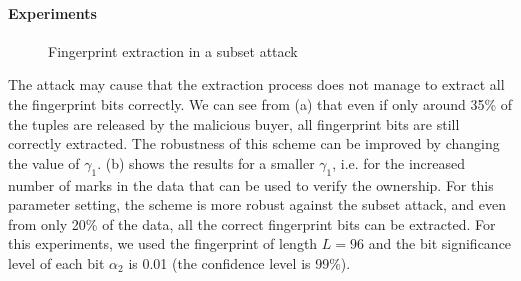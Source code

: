 \paragraph{Experiments}

\begin{figure}
\centering
    \qquad
    \caption{Fingerprint extraction in a subset attack}
    \label{fig:subset-attack-two-level-fp-bits}
\end{figure}

The attack may cause that the extraction process does not manage to extract all the fingerprint bits correctly.
We can see from (a) that even if only around 35\% of the tuples are released by the malicious buyer, all fingerprint bits are still correctly extracted. 
The robustness of this scheme can be improved by changing the value of $\gamma_1$. 
(b) shows the results for a smaller $\gamma_1$, i.e. for the increased number of marks in the data that can be used to verify the ownership. 
For this parameter setting, the scheme is more robust against the subset attack, and even from only 20\% of the data, all the correct fingerprint bits can be extracted. 
For this experiments, we used the fingerprint of length $L=96$ and the bit significance level of each bit $\alpha_2$ is 0.01 (the confidence level is 99\%).

